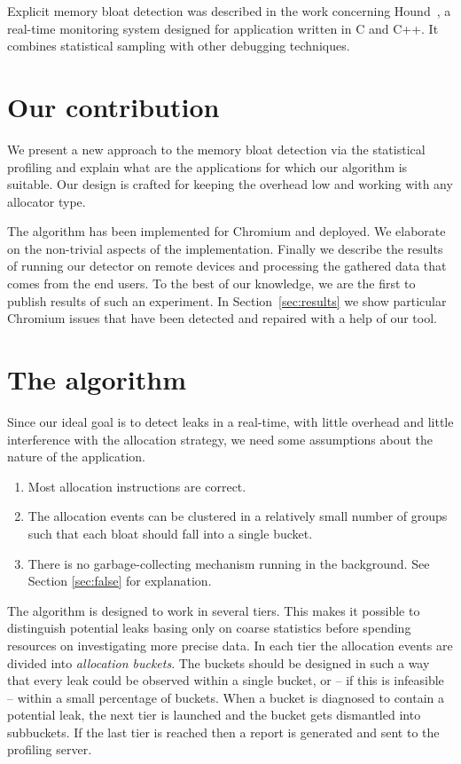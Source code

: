 \documentclass[preprint, numbers]{sigplanconf}
\begin{document}
Explicit memory bloat detection was described in the work concerning Hound~\cite{hound},
a real-time monitoring system designed for application written in C and C++.
It combines statistical sampling with other debugging techniques.

\section{Our contribution}

We present a new approach to the memory bloat detection via the statistical profiling
and explain what are the applications for which our algorithm is suitable.
Our design is crafted for keeping the overhead low and working with any
allocator type.

The algorithm has been implemented for Chromium and deployed.
We elaborate on the non-trivial aspects of the implementation.
Finally we describe the results of running our detector on remote
devices and processing the gathered data that comes from the end users.
To the best of our knowledge, we are the first to publish results
of such an experiment.
In Section~\ref{sec:results} we show particular Chromium issues
that have been detected and repaired with a help of our tool.

\section{The algorithm}
\label{sec:algorithm}

Since our ideal goal is to detect leaks in a real-time, with little overhead and little interference with
the allocation strategy, we need some assumptions about the nature of the application.

\begin{enumerate}
\item Most allocation instructions are correct.
\item The allocation events can be clustered in a relatively small number of groups
	such that each bloat should fall into a single bucket.
\item There is no garbage-collecting mechanism running in the background.
	See Section \ref{sec:false} for explanation.
\end{enumerate}

The algorithm is designed to work in several tiers.
This makes it possible to distinguish potential leaks basing only on coarse statistics before spending resources on investigating more
precise data.
In each tier the allocation events are divided into \textit{allocation buckets}.
The buckets should be designed in such a way that every leak could be observed within a single bucket,
or -- if this is infeasible -- within a small percentage of buckets.
When a bucket is diagnosed to contain a potential leak, the next tier is launched and the bucket gets dismantled
into subbuckets.
If the last tier is reached then a report is generated and sent to the profiling server.
\end{document}
